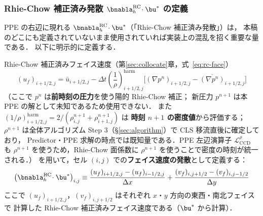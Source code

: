 \subsubsection{Rhie-Chow 補正済み発散 $\bnabla_h^{\mathrm{RC}}\!\cdot\bu^*$ の定義}
\label{sec:rc_divergence}

PPE の右辺に現れる $\bnabla_h^{\mathrm{RC}}\!\cdot\bu^*$（「Rhie-Chow 補正済み発散」）は，
本稿のどこにも定義されていないまま使用されていれば実装上の混乱を招く重要な量である．
以下に明示的に定義する．

\begin{tcolorbox}[defbox, title={Rhie-Chow 補正済み発散 $\bnabla_h^{\mathrm{RC}}\!\cdot\bu^*$ の定義}]
Rhie-Chow 補正済みフェイス速度（第\ref{sec:collocate}章，式~\eqref{eq:rc-face}）
\[
  (u_f)_{i+1/2,j} = \bar{u}_{i+1/2,j}
    - \Delta t \left(\frac{1}{\rho}\right)^{\!\mathrm{harm}}_{i+1/2,j}
      \!\bigl[(\nabla p^n)_{i+1/2,j} - \overline{(\nabla p^n)}_{i+1/2,j}\bigr]
\]
（ここで $p^n$ は\textbf{前時刻の圧力}を使う陽的 Rhie-Chow 補正；
新圧力 $p^{n+1}$ は本 PPE の解として未知であるため使用できない．
また $(1/\rho)^{\mathrm{harm}}_{i+1/2,j} = 2/(\rho^{n+1}_{i,j}+\rho^{n+1}_{i+1,j})$ は
\textbf{時刻 $n+1$ の密度値}から評価する；
$\rho^{n+1}$ は全体アルゴリズム Step 3（§\ref{sec:algorithm}）で CLS 移流直後に確定しており，
Predictor・PPE 求解の時点では既知量である．PPE 左辺演算子 $\mathcal{L}_{\mathrm{CCD}}^{\rho}$ も
$\rho^{n+1}$ を使うため，Rhie-Chow 面係数に $\rho^{n+1}$ を使うことで密度の時刻が統一される．）
を用いて，セル $(i,j)$ での\textbf{フェイス速度の発散}として定義する：
\begin{equation}
  \bigl(\bnabla_h^{\mathrm{RC}}\!\cdot\bu^*\bigr)_{i,j}
  \equiv
  \frac{(u_f)_{i+1/2,j} - (u_f)_{i-1/2,j}}{\Delta x}
  + \frac{(v_f)_{i,j+1/2} - (v_f)_{i,j-1/2}}{\Delta y}
  \label{eq:rc_divergence}
\end{equation}
ここで $(u_f)_{i+1/2,j}$，$(v_f)_{i,j+1/2}$ はそれぞれ $x$・$y$ 方向の東西・南北フェイスで
計算した Rhie-Chow 補正済みフェイス速度である（$\bu^*$ から計算）．
\end{tcolorbox}

